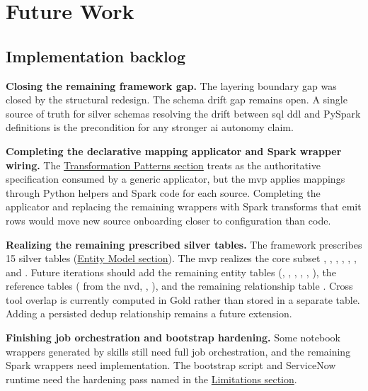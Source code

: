\section*{Future Work}
\label{sec:future-work}

\subsection*{Implementation backlog}

\textbf{Closing the remaining framework gap.} The layering boundary gap was closed by the structural redesign. The schema drift gap remains open. A single source of truth for silver schemas resolving the drift between \gls{sql} \gls{ddl} and PySpark  definitions is the precondition for any stronger \gls{ai} autonomy claim.

\textbf{Completing the declarative mapping applicator and Spark wrapper wiring.} The \hyperref[sec:transformation-patterns]{Transformation Patterns section} treats  as the authoritative specification consumed by a generic applicator, but the \gls{mvp} applies mappings through Python helpers and Spark code for each source. Completing the applicator and replacing the remaining wrappers with Spark transforms that emit rows would move new source onboarding closer to configuration than code.

\textbf{Realizing the remaining prescribed silver tables.} The framework prescribes 15 silver tables (\hyperref[sec:entity-model]{Entity Model section}). The \gls{mvp} realizes the core subset , , , , , , and . Future iterations should add the remaining entity tables (, , , , , ), the reference tables ( from the \gls{nvd}, , ), and the remaining relationship table . Cross tool overlap is currently computed in Gold rather than stored in a separate  table. Adding a persisted dedup relationship remains a future extension.

\textbf{Finishing job orchestration and bootstrap hardening.} Some notebook wrappers generated by skills still need full job orchestration, and the remaining Spark wrappers need implementation. The bootstrap script and ServiceNow runtime need the hardening pass named in the \hyperref[sec:conclusion-limitations]{Limitations section}.

